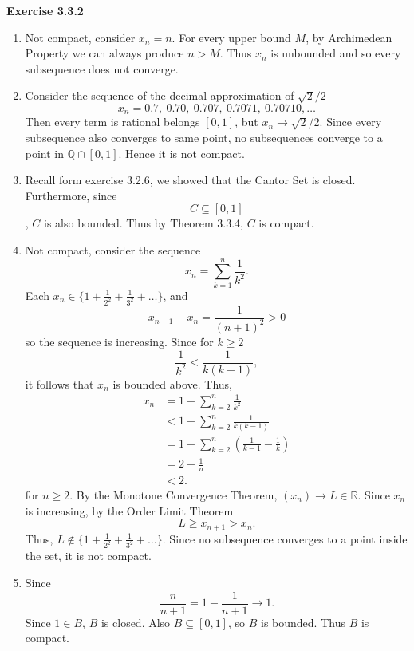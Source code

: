 \documentclass[12pt]{article}
\begin{document}
\textbf{Exercise 3.3.2}
\begin{enumerate}[label=(\alph*)]
    \item Not compact, consider \( x_n = n \).
          For every upper bound \( M \), by Archimedean Property we can always produce \( n > M \).
          Thus \( x_n \) is unbounded and so every subsequence does not converge.

    \item Consider the sequence of the decimal approximation of \( \sqrt{2}/2 \)
          \[
              x_n=0.7,\ 0.70,\ 0.707,\ 0.7071,\ 0.70710,\ldots
          \]
          Then every term is rational belongs \( [0,1] \), but
          \( x_n \to  \sqrt{2}/2 \). Since every subsequence also converges to same point,
          no subsequences converge to a point in \( \mathbb{Q} \cap [0,1] \). Hence it is not compact.


    \item Recall form exercise 3.2.6, we showed that the Cantor Set is closed. Furthermore, since
          \[
              C \subseteq [0,1]
          \]
          , \( C \) is also bounded.
          Thus by Theorem 3.3.4, \( C \) is compact.

    \item Not compact, consider the sequence
          \[
              x_n = \sum_{k=1}^{n} \frac{1}{k^2}.
          \]
          Each \( x_n \in \{1 + \frac{1}{2^2} + \frac{1}{3^2} + \dots \} \), and
          \[
              x_{n+1} - x_{n} = \frac{1}{(n+1)^2} > 0
          \]
          so the sequence is increasing.
          Since for \( k \geq 2 \)
          \[
              \frac{1}{k^2} < \frac{1}{k(k-1)},
          \]
          it follows that \( x_n \) is bounded above.
          Thus,
          \[
              \begin{split}
                  x_n & = 1 + \sum_{k=2}^{n} \frac{1}{k^2}                \\
                      & < 1 + \sum_{k=2}^{n} \frac{1}{k(k-1)}             \\
                      & = 1 + \sum_{k=2}^{n}(\frac{1}{k-1} - \frac{1}{k}) \\
                      & = 2 - \frac{1}{n}                                 \\
                      & < 2.
              \end{split}
          \]
          for \( n \geq 2 \).
          By the Monotone Convergence Theorem, \( (x_n) \to L \in \mathbb{R} \).
          Since \( x_n \) is increasing, by the Order Limit Theorem
          \[
              L \geq x_{n+1} > x_n.
          \]
          Thus, \( L \not \in  \{1 + \frac{1}{2^2} + \frac{1}{3^2} + \dots \}\).
          Since no subsequence converges to a point inside the set, it is not compact.

    \item Since
          \[
              \frac{n}{n+1} = 1 - \frac{1}{n+1} \to 1.
          \]
          Since \( 1 \in B \), \( B \) is closed.
          Also \( B \subseteq [0,1] \), so \( B \) is bounded.
          Thus \( B \) is compact.
\end{enumerate}
\end{document}
